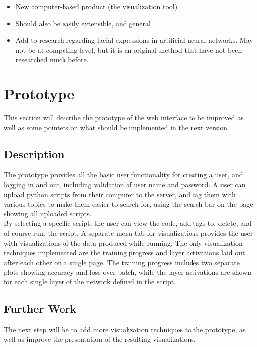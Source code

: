 \begin{itemize}
    \item New computer-based product (the visualization tool)
    \item Should also be easily extensible, and general
    \item Add to research regarding facial expressions in artificial neural networks. May not be at competing level, but it is an original method that have not been researched much before.
\end{itemize}

\section{Prototype}

This section will describe the prototype of the web interface to be improved as well as some pointers on what should be implemented in the next version.

\subsection{Description}

\noindent The prototype provides all the basic user functionality for creating a user, and logging in and out, including validation of user name and password. A user can upload python scripts from their computer to the server, and tag them with various topics to make them easier to search for, using the search bar on the page showing all uploaded scripts. \\

\noindent By selecting a specific script, the user can view the code, add tags to, delete, and of course run, the script. A separate menu tab for visualizations provides the user with visualizations of the data produced while running. The only visualization techniques implemented are the training progress and layer activations laid out after each other on a single page. The training progress includes two separate plots showing accuracy and loss over batch, while the layer activations are shown for each single layer of the network defined in the script.

\subsection{Further Work}

\noindent The next step will be to add more visualization techniques to the prototype, as well as improve the presentation of the resulting visualizations. \\

